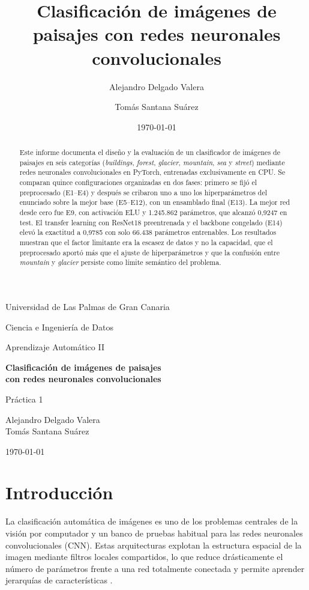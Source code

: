 \documentclass[11pt,a4paper]{article}
\title{Clasificación de imágenes de paisajes con redes neuronales convolucionales}
\author{Alejandro Delgado Valera \and Tomás Santana Suárez}
\date{\today}
\begin{document}
\hypersetup{pageanchor=false}
\begin{titlepage}
\centering
{\large Universidad de Las Palmas de Gran Canaria\par}
{\large Ciencia e Ingeniería de Datos\par}
\vspace{1.0cm}
{\large Aprendizaje Automático II\par}
\vspace{2.2cm}
{\LARGE\bfseries Clasificación de imágenes de paisajes\\[0.3em] con redes neuronales convolucionales\par}
\vspace{0.7cm}
{\large Práctica 1\par}
\vspace{2.8cm}
{\large Alejandro Delgado Valera\\[0.25em] Tomás Santana Suárez\par}
\vfill
{\large \today\par}
\end{titlepage}
\hypersetup{pageanchor=true}

\begin{abstract}
Este informe documenta el diseño y la evaluación de un clasificador de imágenes de paisajes en seis categorías (\emph{buildings}, \emph{forest}, \emph{glacier}, \emph{mountain}, \emph{sea} y \emph{street}) mediante redes neuronales convolucionales en PyTorch, entrenadas exclusivamente en CPU. Se comparan quince configuraciones organizadas en dos fases: primero se fijó el preprocesado (E1--E4) y después se cribaron uno a uno los hiperparámetros del enunciado sobre la mejor base (E5--E12), con un ensamblado final (E13). La mejor red desde cero fue E9, con activación ELU y 1.245.862 parámetros, que alcanzó 0,9247 en test. El transfer learning con ResNet18 preentrenada y el backbone congelado (E14) elevó la exactitud a 0,9785 con solo 66.438 parámetros entrenables. Los resultados muestran que el factor limitante era la escasez de datos y no la capacidad, que el preprocesado aportó más que el ajuste de hiperparámetros y que la confusión entre \emph{mountain} y \emph{glacier} persiste como límite semántico del problema.
\end{abstract}

\section{Introducción}

La clasificación automática de imágenes es uno de los problemas centrales de la visión por computador y un banco de pruebas habitual para las redes neuronales convolucionales (CNN). Estas arquitecturas explotan la estructura espacial de la imagen mediante filtros locales compartidos, lo que reduce drásticamente el número de parámetros frente a una red totalmente conectada y permite aprender jerarquías de características \citep{paszke2019pytorch,he2016deep}.
\end{document}
